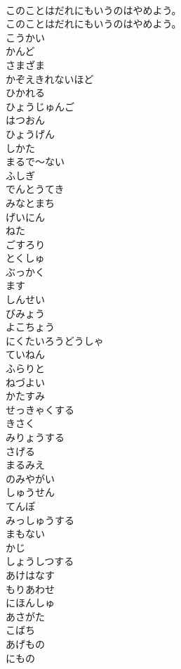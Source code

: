 \documentclass[8pt]{extreport}
\begin{document}
\begin{CJK}{UTF8}{min}
\\	このことはだれにもいうのはやめよう。
\\	このことはだれにもいうのはやめよう。
\\	こうかい
\\	かんど
\\	さまざま
\\	かぞえきれないほど
\\	ひかれる
\\	ひょうじゅんご
\\	はつおん
\\	ひょうげん
\\	しかた
\\	まるで～ない
\\	ふしぎ
\\	でんとうてき
\\	みなとまち
\\	げいにん
\\	ねた
\\	ごすろり
\\	とくしゅ
\\	ぶっかく
\\	ます
\\	しんせい
\\	びみょう
\\	よこちょう
\\	にくたいろうどうしゃ　
\\	ていねん
\\	ふらりと
\\	ねづよい
\\	かたすみ
\\	せっきゃくする
\\	きさく
\\	みりょうする
\\	さげる
\\	まるみえ
\\	のみやがい
\\	しゅうせん
\\	てんぽ
\\	みっしゅうする
\\	まもない
\\	かじ
\\	しょうしつする
\\	あけはなす
\\	もりあわせ
\\	にほんしゅ
\\	あさがた
\\	こばち
\\	あげもの
\\	にもの

\end{CJK}
\end{document}
